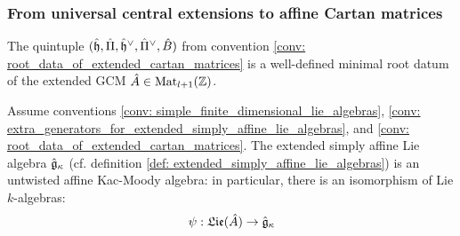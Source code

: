         \subsubsection{From universal central extensions to affine Cartan matrices}
            \begin{lemma} \label{lemma: cartan_subalgebras_of_extended_simply_affine_Lie_algebras}
                \cite[Proposition 12.2.13]{perrin_kac_moody_algebras} The quintuple $(\hat{\mathfrak{h}}, \hat{\Pi}, \hat{\mathfrak{h}}^{\vee}, \hat{\Pi}^{\vee}, \hat{B})$ from convention \ref{conv: root_data_of_extended_cartan_matrices} is a well-defined minimal root datum of the extended GCM $\hat{A} \in \mathrm{Mat}_{l + 1}(\mathbb{Z})$. 
            \end{lemma}
            \begin{theorem} \label{theorem: untwisted_affinisation}
                \cite[Theorem 7.4]{kac_infinite_dimensional_lie_algebras} Assume conventions \ref{conv: simple_finite_dimensional_lie_algebras}, \ref{conv: extra_generators_for_extended_simply_affine_lie_algebras}, and \ref{conv: root_data_of_extended_cartan_matrices}. The extended simply affine Lie algebra $\hat{\mathfrak{g}}_{\kappa}$ (cf. definition \ref{def: extended_simply_affine_lie_algebras}) is an untwisted affine Kac-Moody algebra: in particular, there is an isomorphism of Lie $k$-algebras:
                    $$\psi: \mathfrak{Lie}(\hat{A}) \to \hat{\mathfrak{g}}_{\kappa}$$
            \end{theorem}
